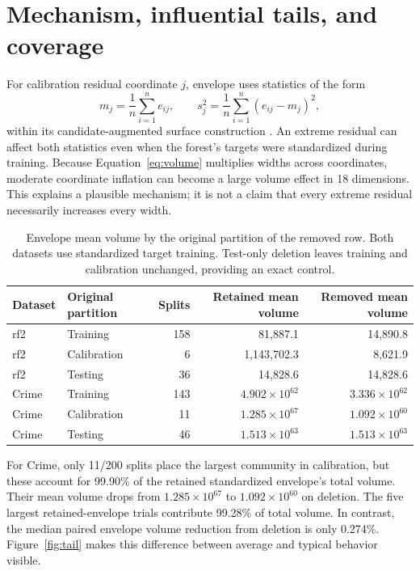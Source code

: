 \documentclass[11pt,letterpaper]{article}
\begin{document}
\section{Mechanism, influential tails, and coverage}\label{sec:mechanism}
For calibration residual coordinate $j$, envelope uses statistics of the form
\begin{equation}
 m_j=\frac{1}{n}\sum_{i=1}^{n}e_{ij},\qquad
 s_j^2=\frac{1}{n}\sum_{i=1}^{n}(e_{ij}-m_j)^2,
 \label{eq:calibration}
\end{equation}
within its candidate-augmented surface construction \cite{methodnote}.
An extreme residual can affect both statistics even when the forest's targets
were standardized during training. Because Equation~\eqref{eq:volume}
multiplies widths across coordinates, moderate coordinate inflation can become
a large volume effect in 18 dimensions. This explains a plausible mechanism;
it is not a claim that every extreme residual necessarily increases every width.

\begin{table}[htbp]
\centering\small
\caption{Envelope mean volume by the original partition of the removed row.
Both datasets use standardized target training. Test-only deletion leaves
training and calibration unchanged, providing an exact control.}
\label{tab:partitions}
\begin{tabular}{llrrr}
\toprule
Dataset & Original partition & Splits & Retained mean volume & Removed mean volume\\
\midrule
rf2 & Training & 158 & 81,887.1 & 14,890.8 \\
rf2 & Calibration & 6 & 1,143,702.3 & 8,621.9 \\
rf2 & Testing & 36 & 14,828.6 & 14,828.6 \\
Crime & Training & 143 & $4.902\times 10^{62}$ & $3.336\times 10^{62}$ \\
Crime & Calibration & 11 & $1.285\times 10^{67}$ & $1.092\times 10^{60}$ \\
Crime & Testing & 46 & $1.513\times 10^{63}$ & $1.513\times 10^{63}$ \\
\bottomrule
\end{tabular}
\end{table}

For Crime, only 11/200 splits place the largest community in calibration,
but these account for 99.90\% of the retained standardized envelope's total
volume. Their mean volume drops from $1.285\times10^{67}$ to
$1.092\times10^{60}$ on deletion. The five largest retained-envelope trials
contribute 99.28\% of total volume. In contrast, the median paired envelope
volume reduction from deletion is only 0.274\%. Figure~\ref{fig:tail} makes
this difference between average and typical behavior visible.
\end{document}
